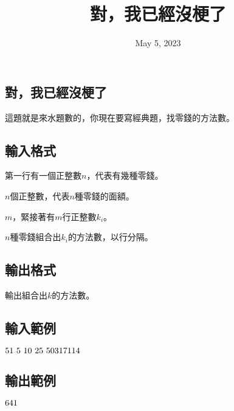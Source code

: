 \documentclass{article}
\title{對，我已經沒梗了}
\date{May 5, 2023}
\begin{document}
\begin{CJK*}{UTF8}{bsmi}

\maketitle

\section*{對，我已經沒梗了}

這題就是來水題數的，你現在要寫經典題，找零錢的方法數。

\subsection*{輸入格式}
第一行有一個正整數$n$，代表有幾種零錢。

$n$個正整數，代表$n$種零錢的面額。

$m$，緊接著有$m$行正整數$k_i$。

$n$種零錢組合出$k_i$的方法數，以行分隔。

\subsection*{輸出格式}
輸出組合出$k$的方法數。

\subsection*{輸入範例}
$5\\1\ 5\ 10\ 25\ 50\\3\\17\\11\\4$

\subsection*{輸出範例}
$6\\4\\1$

\end{CJK*}
\end{document}
